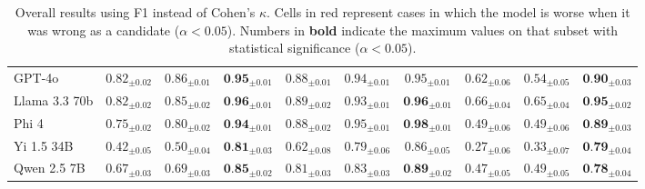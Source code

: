 \begin{table}[ht!]
{\begin{tabular}{l|ccc|ccc|ccc}
\hline
GPT-4o & $0.82_{\pm 0.02 }$ & $0.86_{\pm 0.01 }$ & $\textbf{0.95}_{\pm 0.01 }$ & $0.88_{\pm 0.01 }$ & $0.94_{\pm 0.01 }$ & $0.95_{\pm 0.01 }$ & \R $0.62_{\pm 0.06 }$ & \R $0.54_{\pm 0.05 }$ & \R $\textbf{0.90}_{\pm 0.03 }$ \\
Llama 3.3 70b & $0.82_{\pm 0.02 }$ & $0.85_{\pm 0.02 }$ & $\textbf{0.96}_{\pm 0.01 }$ & $0.89_{\pm 0.02 }$ & $0.93_{\pm 0.01 }$ & $\textbf{0.96}_{\pm 0.01 }$ & \R $0.66_{\pm 0.04 }$ & \R $0.65_{\pm 0.04 }$ & $\textbf{0.95}_{\pm 0.02 }$ \\
Phi 4 & $0.75_{\pm 0.02 }$ & $0.80_{\pm 0.02 }$ & $\textbf{0.94}_{\pm 0.01 }$ & $0.88_{\pm 0.02 }$ & $0.95_{\pm 0.01 }$ & $\textbf{0.98}_{\pm 0.01 }$ & \R $0.49_{\pm 0.06 }$ & \R $0.49_{\pm 0.06 }$ & \R $\textbf{0.89}_{\pm 0.03 }$ \\
Yi 1.5 34B & $0.42_{\pm 0.05 }$ & $0.50_{\pm 0.04 }$ & $\textbf{0.81}_{\pm 0.03 }$ & $0.62_{\pm 0.08 }$ & $0.79_{\pm 0.06 }$ & $0.86_{\pm 0.05 }$ & \R $0.27_{\pm 0.06 }$ & \R $0.33_{\pm 0.07 }$ & $\textbf{0.79}_{\pm 0.04 }$ \\
Qwen 2.5 7B & $0.67_{\pm 0.03 }$ & $0.69_{\pm 0.03 }$ & $\textbf{0.85}_{\pm 0.02 }$ & $0.81_{\pm 0.03 }$ & $0.83_{\pm 0.03 }$ & $\textbf{0.89}_{\pm 0.02 }$ & \R $0.47_{\pm 0.05 }$ & \R $0.49_{\pm 0.05 }$ & \R $\textbf{0.78}_{\pm 0.04 }$ \\


\bottomrule
\end{tabular}
}
\caption{Overall results using F1 instead of Cohen's $\kappa$. Cells in \colorbox{red!30}{red} represent cases in which the model is worse when it was wrong as a candidate ($\alpha < 0.05$). Numbers in \textbf{bold} indicate the maximum values on that subset with statistical significance ($\alpha < 0.05$).}
\label{tab:right-wrong-table-f1-v1}
\end{table}
